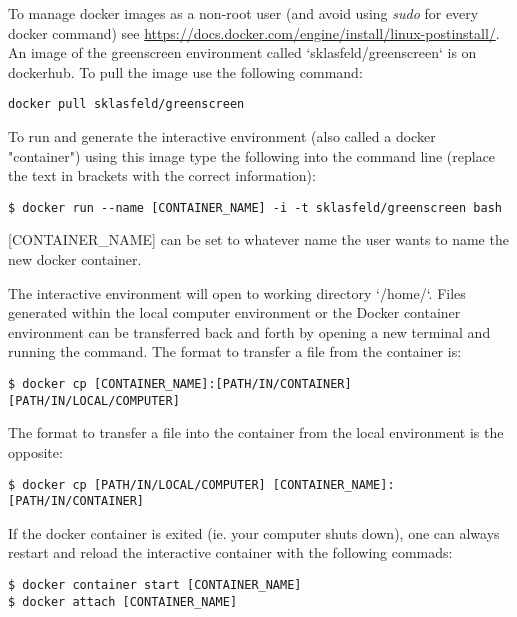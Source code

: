 \documentclass{article}
\begin{document}
\begin{sloppypar}
To manage docker images as a non-root user (and avoid using \emph{sudo} for every docker command) see \url{https://docs.docker.com/engine/install/linux-postinstall/}. An image of the greenscreen environment called `sklasfeld/greenscreen` is on dockerhub. To pull the image use the following command:

\begin{verbatim}
docker pull sklasfeld/greenscreen
\end{verbatim}

To run and generate the interactive environment (also called a docker "container") using this image type the following into the command line (replace the text in brackets with the correct information):

\begin{verbatim}
$ docker run --name [CONTAINER_NAME] -i -t sklasfeld/greenscreen bash
\end{verbatim}

[CONTAINER\_NAME] can be set to whatever name the user wants to name the new docker container.

The interactive environment will open to working directory `/home/`. Files generated within the local computer environment or the Docker container environment can be transferred back and forth by opening a new terminal and running the  command. The format to transfer a file from the container is:

\begin{verbatim}
$ docker cp [CONTAINER_NAME]:[PATH/IN/CONTAINER] [PATH/IN/LOCAL/COMPUTER]
\end{verbatim}

The format to transfer a file into the container from the local environment is the opposite:

\begin{verbatim}
$ docker cp [PATH/IN/LOCAL/COMPUTER] [CONTAINER_NAME]:[PATH/IN/CONTAINER] 
\end{verbatim}

If the docker container is exited (ie. your computer shuts down), one can always restart and reload the interactive container with the following commads:

\begin{verbatim}
$ docker container start [CONTAINER_NAME]
$ docker attach [CONTAINER_NAME] 
\end{verbatim}


\end{sloppypar}
\end{document}

